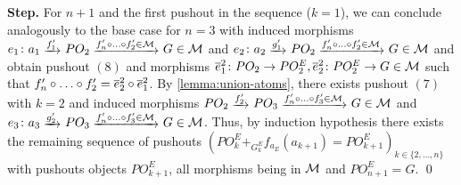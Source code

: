 \textbf{Step.} For $n+1$ and the first pushout in the sequence ($k=1$), we can conclude analogously to the base case for $n=3$ with induced morphisms $e_1\colon a_1 \trans{f'_1} PO_2 \trans{f'_{n} \circ \ldots \circ f'_2 \in \M} G \in \M$ and $e_2\colon a_2 \trans{g'_1} PO_2 \trans{f'_{n} \circ \ldots \circ f'_2 \in \M} G \in \M$ and obtain pushout $(8)$ and morphisms $\overline{e}^2_1\colon PO_2 \to PO^E_2,\overline{e}^2_2\colon PO^E_2 \to G \in {\cal M}$ such that $f'_{n} \circ \ldots \circ f'_2=\overline{e}^2_2 \circ \overline{e}^2_1$.
By \cref{lemma:union-atoms}, there exists pushout $(7)$ with $k=2$ and induced morphisms $PO_2 \trans{f'_2} PO_3 \trans{f'_n \circ \ldots \circ f'_3 \in \M} G \in \M$ and $e_3\colon a_3 \trans{g'_2} PO_3 \trans{f'_n \circ \ldots \circ f'_3 \in \M} G \in \M$.
Thus, by induction hypothesis there exists the remaining sequence of pushouts $(PO^E_k +_{G^E_k} f_{a_E}(a_{k+1}) = PO^E_{k+1})_{k \in \{2,\ldots,n\}}$ with pushouts objects $PO^E_{k+1}$, all morphisms being in ${\cal M}$ and $PO^E_{n+1}=G$.
\qed

